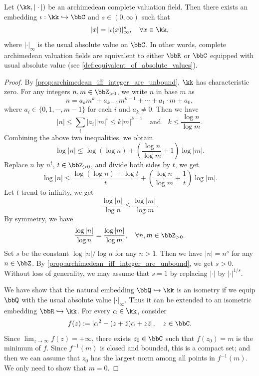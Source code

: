     \begin{theorem}[Ostrowski]\label{thm:classification_of_archimedean_complete_fields}
        Let \((\kk,|\cdot|)\) be an archimedean complete valuation field.
        Then there exists an embedding \(\iota: \kk \hookrightarrow \bbC\) and \(s \in (0, \infty)\) such that
        \[ |x| = |\iota(x)|_\infty^s, \quad \forall x \in \kk, \]
        where \(|\cdot|_\infty\) is the usual absolute value on \(\bbC\).
        In other words, complete archimedean valuation fields are equivalent to either \(\bbR\) or \(\bbC\) equipped with usual absolute value (see \cref{def:equivalent_of_absolute_values}).
    \end{theorem}
    \begin{proof}
        By \cref{prop:archimedean_iff_integer_are_unbound}, \(\kk\) has characteristic zero.
        For any integers \(n,m \in \bbZ_{>0}\), we write \(n\) in base \(m\) as
        \[ n = a_k m^k + a_{k-1} m^{k-1} + \cdots + a_1 \cdot m + a_0, \]
        where \(a_i \in \{0,1,\cdots,m-1\}\) for each \(i\) and \(a_k \neq 0\).
        Then we have
        \[ |n| \leq \sum_{i} |a_i| |m|^i \leq k|m|^{k+1}\quad \text{and} \quad k \leq \frac{\log n}{\log m}. \]
        Combining the above two inequalities, we obtain
        \[ \log |n| \leq  \log (\log n) + \left(\frac{\log n}{\log m} + 1\right) \log |m|. \]
        Replace \(n\) by \(n^t\), \(t \in \bbZ_{>0}\), and divide both sides by \(t\), we get
        \[ \log |n| \leq \frac{\log (\log n) + \log t}{t} + \left(\frac{\log n}{\log m} + \frac{1}{t}\right) \log |m|. \]
        Let \(t\) trend to infinity, we get 
        \[ \frac{\log |n|}{\log n} \leq \frac{\log |m|}{\log m}. \]
        By symmetry, we have
        \[ \frac{\log |n|}{\log n} = \frac{\log |m|}{\log m}, \quad \forall n,m \in \bbZ_{>0}. \]
        Set \(s\) be the constant \(\log |n|/\log n\) for any \(n > 1\).
        Then we have \(|n| = n^s\) for any \(n \in \bbZ\).
        By \cref{prop:archimedean_iff_integer_are_unbound}, we get \(s > 0\).
        Without loss of generality, we may assume that \(s = 1\) by replacing \(|\cdot|\) by \(|\cdot|^{1/s}\).

        We have show that the natural embedding \(\bbQ \hookrightarrow \kk\) is an isometry if we equip \(\bbQ\) with the usual absolute value \(|\cdot|_\infty\).
        Thus it can be extended to an isometric embedding \(\bbR \hookrightarrow \kk\).
        For every \(\alpha \in \kk\), consider 
        \[ f(z) := |\alpha^2 - (z+\bar{z}) \alpha + z\bar{z}|, \quad z \in \bbC. \]
        Since \(\lim_{z \to \infty} f(z) = +\infty\), there exists \(z_0 \in \bbC\) such that \(f(z_0) = m\) is the minimum of \(f\).
        Since \(f^{-1}(m)\) is closed and bounded, this is a compact set; and then we can assume that \(z_0\) has the largest norm among all points in \(f^{-1}(m)\).
        We only need to show that \(m = 0\).


\end{proof}
